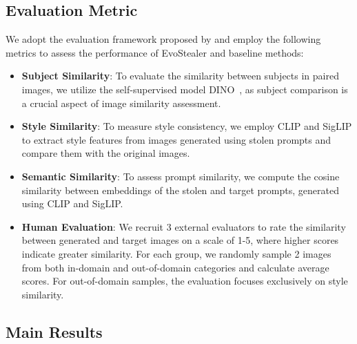 \subsection{Evaluation Metric} \label{metric}
We adopt the evaluation framework proposed by \citet{huang2024vbench} and employ the following metrics to assess the performance of EvoStealer and baseline methods:
\begin{itemize} 
    \item \textbf{Subject Similarity}: To evaluate the similarity between subjects in paired images, we utilize the self-supervised model DINO~\citep{oquab2023dinov2}, as subject comparison is a crucial aspect of image similarity assessment.
    \item \textbf{Style Similarity}: To measure style consistency, we employ CLIP and SigLIP to extract style features from images generated using stolen prompts and compare them with the original images.
    \item \textbf{Semantic Similarity}: To assess prompt similarity, we compute the cosine similarity between embeddings of the stolen and target prompts, generated using CLIP and SigLIP.
    \item \textbf{Human Evaluation}: We recruit 3 external evaluators to rate the similarity between generated and target images on a scale of 1-5, where higher scores indicate greater similarity. For each group, we randomly sample 2 images from both in-domain and out-of-domain categories and calculate average scores. For out-of-domain samples, the evaluation focuses exclusively on style similarity.
\end{itemize}



\subsection{Main Results}


